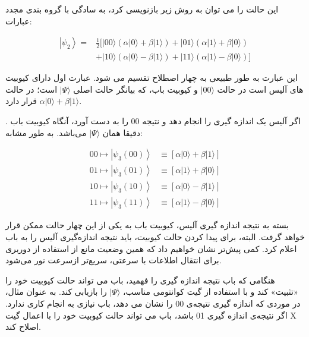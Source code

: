 \documentclass{book}
\begin{document}
این حالت را می توان به روش زیر بازنویسی کرد، به سادگی با گروه بندی مجدد عبارات:

\begin{center}
	\begin{equation}\label{Teleport psi2 rewrite}
		\begin{aligned}
			\left|\psi_2\right\rangle= & \frac{1}{2}[|00\rangle(\alpha|0\rangle+\beta|1\rangle)+|01\rangle(\alpha|1\rangle+\beta|0\rangle) \\
			& +|10\rangle(\alpha|0\rangle-\beta|1\rangle)+|11\rangle(\alpha|1\rangle-\beta|0\rangle)]
		\end{aligned}
	\end{equation}

\end{center}


این عبارت به طور طبیعی به چهار اصطلاح تقسیم می شود. عبارت اول دارای کیوبیت های آلیس است
در حالت $\vert 00 \rangle$ و کیوبیت باب، که بیانگر حالت اصلی $\vert \Psi \rangle$ است؛ در حالت $\alpha \vert 0 \rangle + \beta \vert 1 \rangle$  قرار دارد.


. اگر آلیس یک اندازه گیری را انجام دهد و نتیجه 00 را به دست آورد، آنگاه کیوبیت باب دقیقا همان $\vert \Psi \rangle$ می‌باشد. به طور مشابه:
\begin{center}
	\begin{equation}\label{alice action}
		\begin{aligned}
			00 \longmapsto\left|\psi_3(00)\right\rangle & \equiv[\alpha|0\rangle+\beta|1\rangle] \\
			01 \longmapsto\left|\psi_3(01)\right\rangle & \equiv[\alpha|1\rangle+\beta|0\rangle] \\
			10 \longmapsto\left|\psi_3(10)\right\rangle & \equiv[\alpha|0\rangle-\beta|1\rangle] \\
			11 \longmapsto\left|\psi_3(11)\right\rangle & \equiv[\alpha|1\rangle-\beta|0\rangle]
		\end{aligned}
	\end{equation}
\end{center}

بسته به نتیجه اندازه گیری آلیس، کیوبیت باب به یکی از این چهار حالت ممکن قرار خواهد گرفت. البته، برای پیدا کردن حالت کیوبیت، باید نتیجه اندازه‌گیری آلیس را به باب اعلام کرد.
کمی پیش‌‌تر نشان خواهیم داد که همین وضعیت مانع از استفاده از دوربری برای انتقال اطلاعات با سرعتی، سریع‌تر ازسرعت نور می‌شود.



هنگامی که باب نتیجه اندازه گیری را فهمید، باب می تواند حالت کیوبیت خود را «تثبیت» کند و با استفاده از گیت کوانتومی مناسب، $\vert \Psi \rangle$ را بازیابی کند. به عنوان مثال، در موردی که اندازه گیری نتیجه‌ی 00 را نشان می دهد، باب نیازی به انجام کاری ندارد. اگر نتیجه‌ی اندازه گیری 01 باشد، باب می تواند حالت کیوبیت خود را با اعمال گیت X اصلاح کند.
\end{document}
